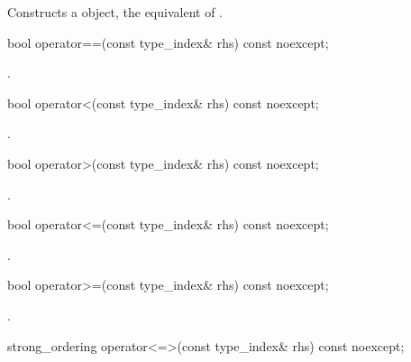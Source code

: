 \begin{itemdescr}
\pnum
\effects
Constructs a  object, the equivalent of .
\end{itemdescr}

%
\begin{itemdecl}
bool operator==(const type_index& rhs) const noexcept;
\end{itemdecl}

\begin{itemdescr}
\pnum
\returns
{}.
\end{itemdescr}

%
\begin{itemdecl}
bool operator<(const type_index& rhs) const noexcept;
\end{itemdecl}

\begin{itemdescr}
\pnum
\returns
{}.
\end{itemdescr}

%
\begin{itemdecl}
bool operator>(const type_index& rhs) const noexcept;
\end{itemdecl}

\begin{itemdescr}
\pnum
\returns
{}.
\end{itemdescr}

%
\begin{itemdecl}
bool operator<=(const type_index& rhs) const noexcept;
\end{itemdecl}

\begin{itemdescr}
\pnum
\returns
{}.
\end{itemdescr}

%
\begin{itemdecl}
bool operator>=(const type_index& rhs) const noexcept;
\end{itemdecl}

\begin{itemdescr}
\pnum
\returns
{}.
\end{itemdescr}

%
\begin{itemdecl}
strong_ordering operator<=>(const type_index& rhs) const noexcept;
\end{itemdecl}

